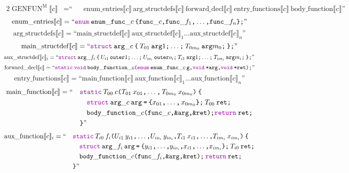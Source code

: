 \documentclass[a4paper,fleqn]{article}
\newcommand{\BRA}[1]{\llbracket #1 \rrbracket}
\DeclareMathOperator{\genfunop}{GENFUN}
\newcommand{\genfunm}[1]{\genfunop^\mathrm{M}\BRA{#1}}
\newcommand{\enumentries}[1]{\mathrm{enum\_entries}\BRA{#1}}
\newcommand{\argstructdefs}[1]{\mathrm{arg\_structdefs}\BRA{#1}}
\newcommand{\mainstructdef}[1]{\mathrm{main\_structdef}\BRA{#1}}
\newcommand{\auxstructdef}[2]{\mathrm{aux\_structdef}\BRA{#1}_{#2}}
\newcommand{\forwarddecl}[1]{\mathrm{forward\_decl}\BRA{#1}}
\newcommand{\entryfunctions}[1]{\mathrm{entry\_functions}\BRA{#1}}
\newcommand{\mainfunction}[1]{\mathrm{main\_function}\BRA{#1}}
\newcommand{\auxfunction}[2]{\mathrm{aux\_function}\BRA{#1}_{#2}}
\newcommand{\bodyfunction}[1]{\mathrm{body\_function}\BRA{#1}}
\newcommand{\ldq}{\text{``}}
\newcommand{\rdq}{\text{''}}
\newcommand{\dq}[1]{\text{``}#1\text{''}}
\newcommand{\ttparen}[1]{\texttt{(}#1\texttt{)}}
\newcommand{\ttlbrace}{\texttt{\char '173}}
\newcommand{\ttrbrace}{\texttt{\char '175}}
\newcommand{\ttbrace}[1]{\ttlbrace#1\ttrbrace}
\newcommand{\tteq}{\texttt{=}}
\newcommand{\ttsemi}{\texttt{;}}
\newcommand{\ttcomma}{\texttt{,}}
\newcommand{\ttstar}{\texttt{*}}
\newcommand{\ttamp}{\texttt{\&}}
\newcommand{\kwstruct}{\mbox{\color{myviolet}\ttfamily struct}}
\newcommand{\kwvoid}{\mbox{\color{myviolet}\ttfamily void}}
\newcommand{\kwCreturn}{\mbox{\color{myviolet}\ttfamily return}}
\newcommand{\kwenum}{\mbox{\color{myviolet}\ttfamily enum}}
\newcommand{\kwstatic}{\mbox{\color{myviolet}\ttfamily static}}
\begin{document}
\begin{alignat*}{2}
  \genfunm{c} &= \ldq && \enumentries{c}~\argstructdefs{c}~\forwarddecl{c}~\entryfunctions{c}~\bodyfunction{c} \rdq
\end{alignat*}
\[ \enumentries{c} = \dq{\kwenum\:\mathtt{enum\_func\_}c\:\ttbrace{ \mathtt{func\_}c\ttcomma \mathtt{func\_}f_1\ttcomma \dotsc\ttcomma \mathtt{func\_}f_n }\ttsemi} \]
\[ \argstructdefs{c} = \dq{\mainstructdef{c}\:\auxstructdef{c}{1} \ldots \auxstructdef{c}{n}} \]
\[ \mainstructdef{c} = \dq{\kwstruct\:\mathtt{arg\_}c\:\ttbrace{\:T_{01}\:\mathtt{arg}1\ttsemi \ldots\ttsemi\: T_{0m_0}\:\mathtt{arg}m_0\ttsemi\:}\ttsemi} \]
\[ \auxstructdef{c}{i} = \dq{\kwstruct\:\mathtt{arg\_}f_i\:\ttbrace{\:U_{i1}\:\mathtt{outer}1\ttsemi \ldots\ttsemi\: U_{io_i}\:\mathtt{outer}o_i\ttsemi\:T_{i1}\:\mathtt{arg}1\ttsemi \ldots\ttsemi\: T_{im_i}\:\mathtt{arg}m_i\ttsemi\:}\ttsemi} \]
\[ \forwarddecl{c} = \dq{\kwstatic\:\kwvoid\:\mathtt{body\_function\_}c\ttparen{\kwenum\:\mathtt{enum\_func\_}c\:\mathtt{g}\ttcomma \kwvoid\:\mathtt{\ttstar arg}\ttcomma \kwvoid\:\mathtt{\ttstar ret}}\ttsemi} \]
\[ \entryfunctions{c} = \dq{\mainfunction{c}\:\auxfunction{c}{1} \ldots \auxfunction{c}{n}} \]
\begin{alignat*}{2}
  \mainfunction{c} &= \ldq && \kwstatic\:T_{00}\:c\ttparen{T_{01}\:x_{01}\ttcomma\dotsc\ttcomma\, T_{0m_0}\:x_{0m_0}}\:\ttlbrace \\
  & && \quad \kwstruct\:\mathtt{arg\_}c\:\mathtt{arg}\:\tteq\:\ttbrace{ x_{01}\ttcomma\dotsc\ttcomma\, x_{0m_0} }\ttsemi\:T_{00}\:\mathtt{ret}\ttsemi \\
  & && \quad \mathtt{body\_function\_}c\ttparen{\mathtt{func\_}c\ttcomma \ttamp\mathtt{arg}\ttcomma \ttamp\mathtt{ret}}\ttsemi \kwCreturn\:\mathtt{ret}\ttsemi \\
  & && \ttrbrace \rdq
\end{alignat*}
\begin{alignat*}{2}
  \auxfunction{c}{i} &= \ldq && \kwstatic\:T_{i0}\:f_i\ttparen{U_{i1}\:y_{i1}\ttcomma\dotsc\ttcomma U_{io_i}\:y_{io_i}\ttcomma T_{i1}\:x_{i1}\ttcomma\dotsc\ttcomma T_{im_i}\:x_{im_i}}\:\ttlbrace \\
  & && \quad \kwstruct\:\mathtt{arg\_}f_i\:\mathtt{arg}\:\tteq\:\ttbrace{ y_{i1}\ttcomma\dotsc\ttcomma y_{io_i}\ttcomma x_{i1}\ttcomma\dotsc\ttcomma x_{im_i} }\ttsemi\:T_{i0}\:\mathtt{ret}\ttsemi\\
  & && \quad \mathtt{body\_function\_}c\ttparen{\mathtt{func\_}f_i\ttcomma \ttamp\mathtt{arg}\ttcomma \ttamp\mathtt{ret}}\ttsemi\:\kwCreturn\:\mathtt{ret}\ttsemi \\
  & && \ttrbrace \rdq
\end{alignat*}
\end{document}
